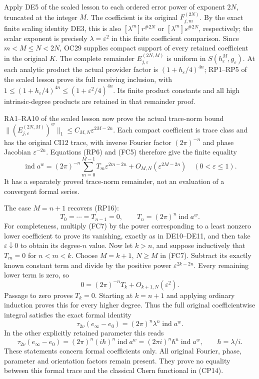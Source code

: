 \documentclass[
  11pt,
]{article}
\begin{document}
Apply DE5 of the scaled lesson to each ordered error power of exponent
\(2N\), truncated at the integer \(M\). The coefficient is its original
\(F_{j,m}^{(2N)}\). By the exact finite scaling identity DE3, this is
also \([\lambda^m]r^{\#2N}\) or \([\lambda^m]s^{\#2N}\), respectively;
the scalar exponent is precisely \(\lambda=\varepsilon^2\) in this
finite coefficient comparison. Since \(m<M\le N<2N\), OC29 supplies
compact support of every retained coefficient in the original \(K\). The
complete remainder \(E_{j,\varepsilon}^{(2N,M)}\) is uniform in
\(S(h_\varepsilon^M,g_\varepsilon)\). At each analytic product the
actual provider factor is \((1+h_\varepsilon/4)^{4n}\); RP1--RP5 of the
scaled lesson prove its full receiving inclusion, with
\(1\le(1+h_\varepsilon/4)^{4n}\le(1+\varepsilon^2/4)^{4n}\). Its finite
product constants and all high intrinsic-degree products are retained in
that remainder proof.

RA1--RA10 of the scaled lesson now prove the actual trace-norm bound
\(\|(E_{j,\varepsilon}^{(2N,M)})^w\|_1\le C_{M,N}\varepsilon^{2M-2n}\).
Each compact coefficient is trace class and has the original CI12 trace,
with inverse Fourier factor \((2\pi)^{-n}\) and phase Jacobian
\(\varepsilon^{-2n}\). Equations (RP6) and (FC5) therefore give the
finite equality \[
 \operatorname{ind}a^w
 =(2\pi)^{-n}\sum_{m=0}^{M-1}
             T_m\varepsilon^{2m-2n}
       +O_{M,N}(\varepsilon^{2M-2n})
 \quad(0<\varepsilon\le1).
 \tag{FC7}
\] It has a separately proved trace-norm remainder, not an evaluation of
a convergent formal series.

The case \(M=n+1\) recovers (RP16): \[
 T_0=\cdots=T_{n-1}=0,
 \qquad T_n=(2\pi)^n\operatorname{ind}a^w.
 \tag{FC8}
\] For completeness, multiply (FC7) by the power corresponding to a
least nonzero lower coefficient to prove its vanishing, exactly as in
DE10--DE11, and then take \(\varepsilon\downarrow0\) to obtain its
degree-\(n\) value. Now let \(k>n\), and suppose inductively that
\(T_m=0\) for \(n<m<k\). Choose \(M=k+1\), \(N\ge M\) in (FC7). Subtract
its exactly known constant term and divide by the positive power
\(\varepsilon^{2k-2n}\). Every remaining lower term is zero, so \[
 0=(2\pi)^{-n}T_k+O_{k+1,N}(\varepsilon^2).
 \tag{FC9}
\] Passage to zero proves \(T_k=0\). Starting at \(k=n+1\) and applying
ordinary induction proves this for every higher degree. Thus the full
original coefficientwise integral satisfies the exact formal identity \[
 \boxed{\displaystyle
 \tau_{2\nu}(e_\infty-e_0)
     =(2\pi)^n\lambda^n\operatorname{ind}a^w.}
 \tag{FC10}
\] In the other explicitly retained parameter this reads \[
 \tau_{2\nu}(e_\infty-e_0)
      =(2\pi)^n(i\hbar)^n\operatorname{ind}a^w
      =(2\pi i)^n\hbar^n\operatorname{ind}a^w,
 \qquad \hbar=\lambda/i.
 \tag{FC11}
\] These statements concern formal coefficients only. All original
Fourier, phase, parameter and orientation factors remain present. They
prove no equality between this formal trace and the classical Chern
functional in (CP14).
\end{document}

